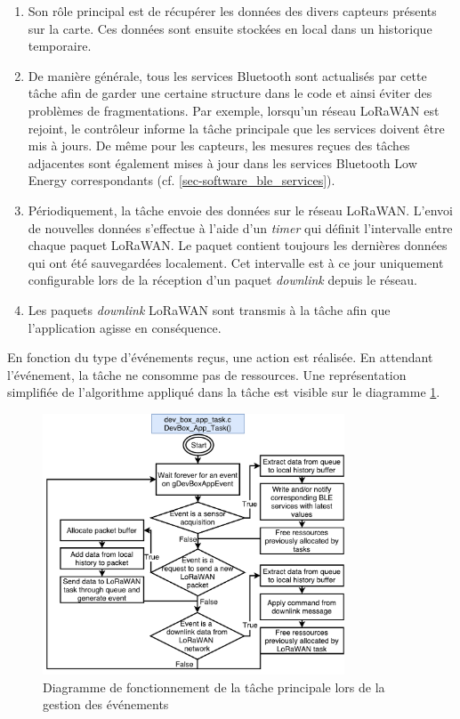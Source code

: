\begin{enumerate}
    \item Son rôle principal est de récupérer les données des divers capteurs présents sur la carte. Ces données sont ensuite stockées en local dans un historique temporaire.
    
    \item De manière générale, tous les services Bluetooth sont actualisés par cette tâche afin de garder une certaine structure dans le code et ainsi éviter des problèmes de fragmentations. Par exemple, lorsqu'un réseau LoRaWAN est rejoint, le contrôleur informe la tâche principale que les services doivent être mis à jours. De même pour les capteurs, les mesures reçues des tâches adjacentes sont également mises à jour dans les services Bluetooth Low Energy correspondants (cf. \cref{sec-software_ble_services}).
    
    \item Périodiquement, la tâche envoie des données sur le réseau LoRaWAN. L'envoi de nouvelles données s'effectue à l'aide d'un \textit{timer} qui définit l'intervalle entre chaque paquet LoRaWAN. Le paquet contient toujours les dernières données qui ont été sauvegardées localement. Cet intervalle est à ce jour uniquement configurable lors de la réception d'un paquet \textit{downlink} depuis le réseau.
    
    \item Les paquets \textit{downlink} LoRaWAN sont transmis à la tâche afin que l'application agisse en conséquence.
\end{enumerate}



En fonction du type d'événements reçus, une action est réalisée. En attendant l'événement, la tâche ne consomme pas de ressources. Une représentation simplifiée de l'algorithme appliqué dans la tâche est visible sur le diagramme \cref{fig-diagram_main_task}. 

\begin{figure}[ht!]
    \centering
    \includegraphics[width=0.8\textwidth]{Figures/Software/diagram_main_task.pdf}
    \caption{Diagramme de fonctionnement de la tâche principale lors de la gestion des événements}
    \label{fig-diagram_main_task}
\end{figure}

